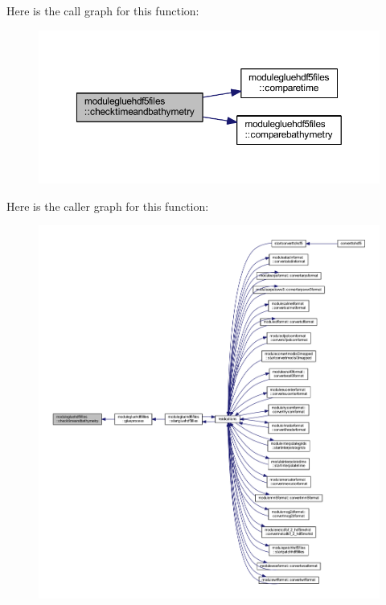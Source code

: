 Here is the call graph for this function\+:\nopagebreak
\begin{figure}[H]
\begin{center}
\leavevmode
\includegraphics[width=350pt]{namespacemodulegluehdf5files_a0770b2d20631e91c338f1f9a7db63c8a_cgraph}
\end{center}
\end{figure}
Here is the caller graph for this function\+:\nopagebreak
\begin{figure}[H]
\begin{center}
\leavevmode
\includegraphics[width=350pt]{namespacemodulegluehdf5files_a0770b2d20631e91c338f1f9a7db63c8a_icgraph}
\end{center}
\end{figure}
\mbox{\label{namespacemodulegluehdf5files_ada0309bfc59c3d5ea77eb5355fff2964}} 
